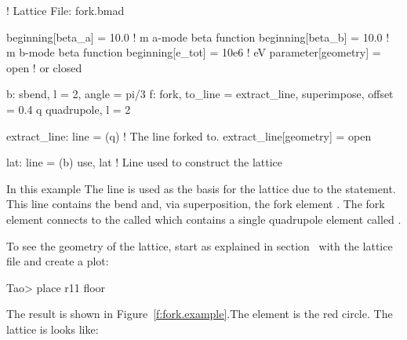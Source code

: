 \documentclass{hitec}
\begin{document}
\begin{code}
! Lattice File: fork.bmad

beginning[beta_a] = 10.0        ! m  a-mode beta function
beginning[beta_b] = 10.0        ! m  b-mode beta function
beginning[e_tot] = 10e6         ! eV 
parameter[geometry] = open      ! or closed

b: sbend, l = 2, angle = pi/3
f: fork, to_line = extract_line, superimpose, offset = 0.4
q quadrupole, l = 2

extract_line: line = (q)       ! The line forked to.
extract_line[geometry] = open

lat: line = (b)
use, lat                ! Line used to construct the lattice
\end{code}

In this example The  line is used as the basis for the lattice due to the 
statement.  This line contains the bend  and, via superposition, the fork element . The
fork element  connects to the  called  which contains a single 
quadrupole element called . 

To see the geometry of the lattice, start \tao as explained in section~ with the
lattice file  and create a  plot:
\begin{code}
Tao> place r11 floor
\end{code}

The result is shown in Figure~\ref{f:fork.example}.The  element is the red circle.
The lattice is looks like:
\end{document}
